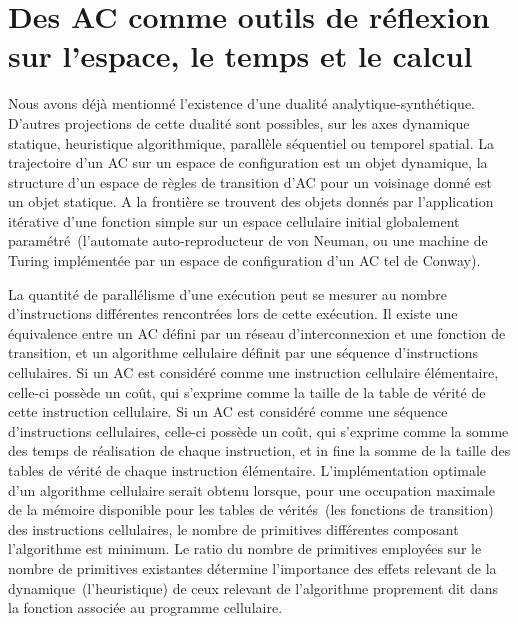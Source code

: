 \section[AC, espace, temps et calcul]%
{Des AC comme outils de réflexion sur l'espace, le temps et le calcul}

Nous avons déjà mentionné l'existence d'une dualité
analytique-synthétique. %
D'autres projections de cette dualité sont possibles, sur les axes
dynamique statique, heuristique algorithmique, parallèle séquentiel ou
temporel spatial. %
La trajectoire d'un AC sur un espace de configuration est un objet
dynamique, la structure d'un espace de règles de transition d'AC pour
un voisinage donné est un objet statique. %
A la frontière se trouvent des objets donnés par l'application
itérative d'une fonction simple sur un espace cellulaire initial
globalement paramétré~(l'automate auto-reproducteur de von Neuman, ou
une machine de Turing implémentée par un espace de configuration
d'un AC tel  de Conway). %

La quantité de parallélisme d'une exécution peut se mesurer au nombre
d'instructions différentes rencontrées lors de cette exécution. %
Il existe une équivalence entre un AC défini par un réseau
d'interconnexion et une fonction de transition, et un algorithme
cellulaire définit par une séquence d'instructions
cellulaires. %
Si un AC est considéré comme une instruction cellulaire élémentaire,
celle-ci possède un coût, qui s'exprime comme la taille de la table
de vérité de cette instruction cellulaire. %
Si un AC est considéré comme une séquence d'instructions cellulaires,
celle-ci possède un coût, qui s'exprime comme la somme des temps de
réalisation de chaque instruction, et in fine la somme de la taille
des tables de vérité de chaque instruction élémentaire. %
L'implémentation optimale d'un algorithme cellulaire serait obtenu
lorsque, pour une occupation maximale de la mémoire disponible pour les
tables de vérités~(les fonctions de transition) des instructions
cellulaires, le nombre de primitives différentes composant l'algorithme
est minimum. %
Le ratio du nombre de primitives employées sur le nombre de primitives
existantes détermine l'importance des effets relevant de la
dynamique~(l'heuristique) de ceux relevant de l'algorithme proprement
dit dans la fonction associée au programme cellulaire.

